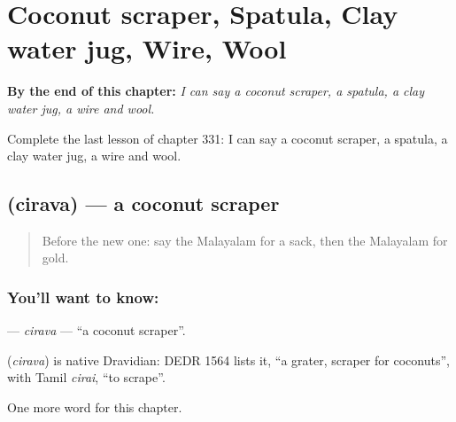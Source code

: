 
\chapter{Coconut scraper, Spatula, Clay water jug, Wire, Wool}
\label{ch:ml-coconut-scraper-spatula-clay-water-jug-wire-wool}

\begin{chapteropening}
\textbf{By the end of this chapter:} \emph{I can say a coconut scraper, a spatula, a clay water jug, a wire and wool.}

Complete the last lesson of chapter 331: I can say a coconut scraper, a spatula, a clay water jug, a wire and wool.
\end{chapteropening}

\section[\texorpdfstring{\ml{ചിരവ} (cirava)}{ചിരവ (cirava)}]{ (cirava) — a coconut scraper}

\label{lesson:ML-C331-cirava}



\begin{quote}
Before the new one: say the Malayalam for a sack, then the Malayalam for gold.
\end{quote}

\subsection*{You'll want to know: }
\textbf{} — \emph{cirava} — \textquotedblleft{}a coconut scraper\textquotedblright{}.

\begin{cousinweb}
\textbf{} (\emph{cirava}) is native Dravidian: DEDR 1564 lists it, \textquotedblleft{}a grater, scraper for coconuts\textquotedblright{}, with Tamil \emph{cirai}, \textquotedblleft{}to scrape\textquotedblright{}.
\end{cousinweb}

\begin{grammarlens}[title={What you've built}]
One more word for this chapter.
\end{grammarlens}

